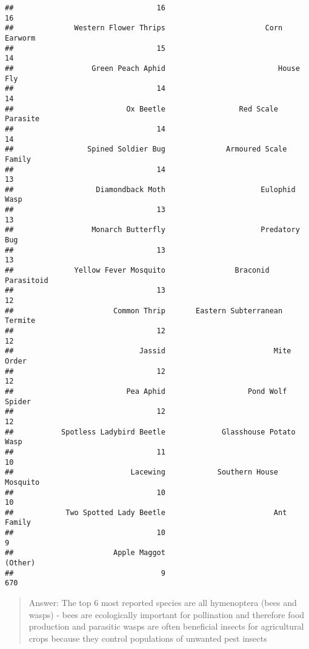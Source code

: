 \documentclass[
]{article}
\begin{document}
\begin{verbatim}
##                                 16                                 16 
##              Western Flower Thrips                       Corn Earworm 
##                                 15                                 14 
##                  Green Peach Aphid                          House Fly 
##                                 14                                 14 
##                          Ox Beetle                 Red Scale Parasite 
##                                 14                                 14 
##                 Spined Soldier Bug              Armoured Scale Family 
##                                 14                                 13 
##                   Diamondback Moth                      Eulophid Wasp 
##                                 13                                 13 
##                  Monarch Butterfly                      Predatory Bug 
##                                 13                                 13 
##              Yellow Fever Mosquito                Braconid Parasitoid 
##                                 13                                 12 
##                       Common Thrip       Eastern Subterranean Termite 
##                                 12                                 12 
##                             Jassid                         Mite Order 
##                                 12                                 12 
##                          Pea Aphid                   Pond Wolf Spider 
##                                 12                                 12 
##           Spotless Ladybird Beetle             Glasshouse Potato Wasp 
##                                 11                                 10 
##                           Lacewing            Southern House Mosquito 
##                                 10                                 10 
##            Two Spotted Lady Beetle                         Ant Family 
##                                 10                                  9 
##                       Apple Maggot                            (Other) 
##                                  9                                670
\end{verbatim}

\begin{quote}
Answer: The top 6 most reported species are all hymenoptera (bees and
wasps) - bees are ecologically important for pollination and therefore
food production and parasitic wasps are often beneficial insects for
agricultural crops because they control populations of unwanted pest
insects
\end{quote}
\end{document}
